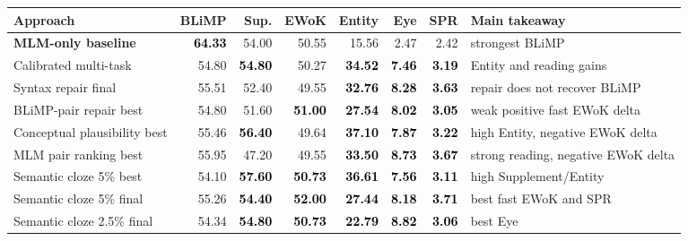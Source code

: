 \begin{table}[t]
\centering
\scriptsize
\setlength{\tabcolsep}{3pt}
\begin{tabularx}{\textwidth}{lrrrrrrX}
\toprule
\textbf{Approach} & \textbf{BLiMP} & \textbf{Sup.} & \textbf{EWoK} & \textbf{Entity} & \textbf{Eye} & \textbf{SPR} & \textbf{Main takeaway} \\
\midrule
\rowcolor{tablegray} \textbf{MLM-only baseline} & \textcolor{black}{\textbf{64.33}} & 54.00 & 50.55 & 15.56 & 2.47 & 2.42 & strongest BLiMP \\
Calibrated multi-task & 54.80 & \textcolor{black}{\textbf{54.80}} & 50.27 & \textcolor{black}{\textbf{34.52}} & \textcolor{black}{\textbf{7.46}} & \textcolor{black}{\textbf{3.19}} & Entity and reading gains \\
\rowcolor{tablegray} Syntax repair final & 55.51 & 52.40 & 49.55 & \textcolor{black}{\textbf{32.76}} & \textcolor{black}{\textbf{8.28}} & \textcolor{black}{\textbf{3.63}} & repair does not recover BLiMP \\
BLiMP-pair repair best & 54.80 & 51.60 & \textcolor{black}{\textbf{51.00}} & \textcolor{black}{\textbf{27.54}} & \textcolor{black}{\textbf{8.02}} & \textcolor{black}{\textbf{3.05}} & weak positive fast EWoK delta \\
\rowcolor{tablegray} Conceptual plausibility best & 55.46 & \textcolor{black}{\textbf{56.40}} & 49.64 & \textcolor{black}{\textbf{37.10}} & \textcolor{black}{\textbf{7.87}} & \textcolor{black}{\textbf{3.22}} & high Entity, negative EWoK delta \\
MLM pair ranking best & 55.95 & 47.20 & 49.55 & \textcolor{black}{\textbf{33.50}} & \textcolor{black}{\textbf{8.73}} & \textcolor{black}{\textbf{3.67}} & strong reading, negative EWoK delta \\
\midrule
\rowcolor{tablegray} Semantic cloze 5\% best & 54.10 & \textcolor{black}{\textbf{57.60}} & \textcolor{black}{\textbf{50.73}} & \textcolor{black}{\textbf{36.61}} & \textcolor{black}{\textbf{7.56}} & \textcolor{black}{\textbf{3.11}} & high Supplement/Entity \\
Semantic cloze 5\% final & 55.26 & \textcolor{black}{\textbf{54.40}} & \textcolor{black}{\textbf{52.00}} & \textcolor{black}{\textbf{27.44}} & \textcolor{black}{\textbf{8.18}} & \textcolor{black}{\textbf{3.71}} & best fast EWoK and SPR \\
\rowcolor{tablegray} Semantic cloze 2.5\% final & 54.34 & \textcolor{black}{\textbf{54.80}} & \textcolor{black}{\textbf{50.73}} & \textcolor{black}{\textbf{22.79}} & \textcolor{black}{\textbf{8.82}} & \textcolor{black}{\textbf{3.06}} & best Eye \\

\end{tabularx}
\end{table}
